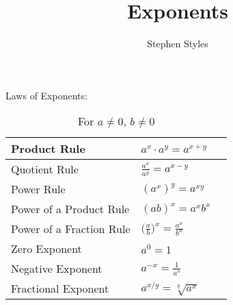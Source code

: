 \documentclass[16pt]{article}
\title{Exponents}
\author{Stephen Styles}
\theoremstyle{remark}
\begin{document}
\maketitle

Laws of Exponents:\\

\begin{table}[h!]
\centering
\caption{For $a\not= 0$, $b \not= 0$}
\begin{tabular}{||>{\centering\arraybackslash}m{1.5in} | M{1.5in}|| N } 
 \hline
 Product Rule & $\displaystyle{a^x \cdot a^y = a^{x+y}}$ &\\
 \hline
 Quotient Rule & $\displaystyle{\frac{a^x}{a^y}=a^{x-y}}$&\\
 \hline
 Power Rule & $\displaystyle{(a^x)^y = a^{xy}}$\\
 \hline
 Power of a Product Rule & $\displaystyle{(ab)^x = a^x b^x}$&\\ 
 \hline
 Power of a Fraction Rule & $\displaystyle{\bigg(\frac{a}{b}\bigg)^x = \frac{a^x}{b^x}}$&\\
 \hline
 Zero Exponent &$\displaystyle{a^0 = 1}$&\\
 \hline
 Negative Exponent & $\displaystyle{a^{-x} = \frac{1}{a^x}}$ &\\
 \hline
 Fractional Exponent & $\displaystyle{a^{x/y} = \sqrt[y]{a^x}}$&\\
 \hline
\end{tabular}
\end{table}
\end{document}

